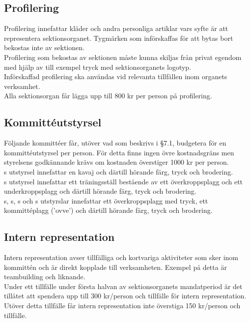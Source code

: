 \documentclass[11pt, includeaddress]{classes/cthit}
\begin{document}
\subsection{Profilering}
Profilering innefattar kläder och andra personliga artiklar vars syfte är att representera sektionsorganet. 
Tygmärken som införskaffas för att bytas bort bekostas inte av sektionen. \\

Profilering som bekostas av sektionen måste kunna skiljas från privat egendom med hjälp av till exempel tryck med sektionsorganets logotyp. \\

Införskaffad profilering ska användas vid relevanta tillfällen inom organets verksamhet. \\

Alla sektionsorgan får lägga upp till 800 kr per person på profilering.

\subsection{Kommittéutstyrsel}
Följande kommittéer får, utöver vad som beskrivs i §7.1, budgetera för en kommittéutstyrsel per person. 
För detta finns ingen övre kostnadsgräns men styrelsens godkännande krävs om kostnaden överstiger 1000 kr per person. \\

\ARMIT{}s utstyrsel innefattar en kavaj och därtill hörande färg, tryck och brodering. \\

\FRITID{}s utstyrsel innefattar ett träningsställ bestående av ett överkroppsplagg och ett underkroppsplagg och därtill hörande färg, tryck och brodering. \\

\FLASHIT{}s, \NOLLKIT{}s, \PRIT{}s och \SEXIT{}s utstyrslar innefattar ett överkroppsplagg med tryck, ett kommittéplagg (’ovve’) och därtill hörande färg, tryck och brodering.

\subsection{Intern representation}
Intern representation avser tillfälliga och kortvariga aktiviteter som sker inom kommittén och är direkt kopplade till verksamheten. Exempel på detta är teambuilding och liknande. \\

Under ett tillfälle under första halvan av sektionsorganets mandatperiod är det tillåtet att spendera upp till 300 kr/person och tillfälle för intern representation. Utöver detta tillfälle får intern representation inte överstiga 150 kr/person och tillfälle. \\
\end{document}
